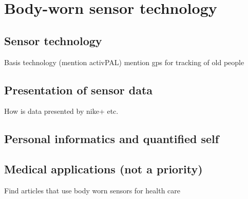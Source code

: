 \chapter{Body-worn sensor technology}

\section{Sensor technology}
Basis technology (mention activPAL) mention gps for tracking of old people

\section{Presentation of sensor data}
How is data presented by nike+ etc.

\section{Personal informatics and quantified self}

\section{Medical applications (not a priority)}
Find articles that use body worn sensors for health care